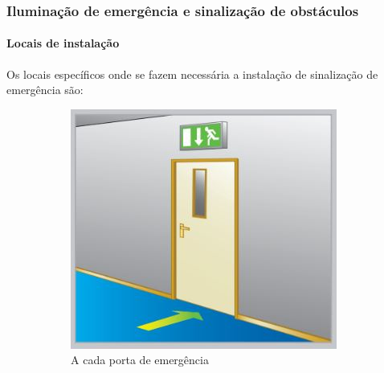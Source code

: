 \subsubsection{Iluminação de emergência e sinalização de obstáculos}


	\paragraph*{Locais de instalação}
	
	Os locais específicos onde se fazem necessária a instalação de sinalização de emergência são:
	
	\begin{figure}[H]
		\centering
		\begin{subfigure}[b]{0.3\textwidth}
			\centering
			\includegraphics[width=\textwidth]{Figures/3. Lighting/light-safety1.jpg}
			\caption{A cada porta de emergência}
			\label{fig: style 1 image a}
		\end{subfigure}
		\hfill
		\begin{subfigure}[b]{0.3\textwidth}
			\centering

\end{subfigure}
\end{figure}
